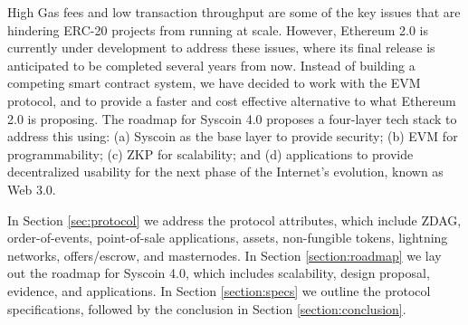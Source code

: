 \documentclass[peerreview]{ieeesyscoin}
\begin{document}
High Gas fees and low transaction throughput are some of the key issues that are hindering ERC-20 projects from running at scale. However, Ethereum 2.0 is currently under development to address these issues, where its final release is anticipated to be completed several years from now. Instead of building a competing smart contract system, we have decided to work with the EVM protocol, and to provide a faster and cost effective alternative to what Ethereum 2.0 is proposing. The roadmap for Syscoin 4.0 proposes a four-layer tech stack to address this using: (a) Syscoin as the base layer to provide security; (b) EVM for programmability; (c) ZKP for scalability; and (d) applications to provide decentralized usability for the next phase of the Internet's evolution, known as Web 3.0. 

In Section \ref{sec:protocol} we address the protocol attributes, which include ZDAG, order-of-events, point-of-sale applications, assets, non-fungible tokens, lightning networks, offers/escrow, and masternodes. In Section \ref{section:roadmap} we lay out the roadmap for Syscoin 4.0, which includes scalability, design proposal, evidence, and applications. In Section \ref{section:specs} we outline the protocol specifications, followed by the conclusion in Section \ref{section:conclusion}.
\end{document}
